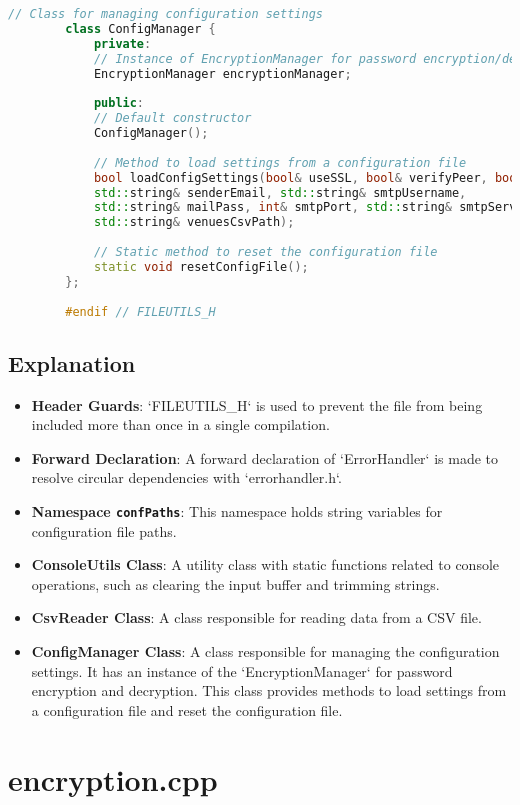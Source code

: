\documentclass{article}
\begin{document}
\begin{mdframed}[backgroundcolor=background, hidealllines=false, innerleftmargin=15pt, innerrightmargin=5pt, innertopmargin=0pt, innerbottommargin=-5pt, linecolor=accent]
\begin{lstlisting}[language=C++]
		// Class for managing configuration settings
		class ConfigManager {
			private:
			// Instance of EncryptionManager for password encryption/decryption
			EncryptionManager encryptionManager;
			
			public:
			// Default constructor
			ConfigManager();
			
			// Method to load settings from a configuration file
			bool loadConfigSettings(bool& useSSL, bool& verifyPeer, bool& verifyHost, bool& verbose, 
			std::string& senderEmail, std::string& smtpUsername, 
			std::string& mailPass, int& smtpPort, std::string& smtpServer, 
			std::string& venuesCsvPath);
			
			// Static method to reset the configuration file
			static void resetConfigFile();
		};
		
		#endif // FILEUTILS_H
	\end{lstlisting}
\end{mdframed}
	\subsection*{Explanation}
	\begin{itemize}
		\item \textbf{Header Guards}: `FILEUTILS\_H` is used to prevent the file from being included more than once in a single compilation.
		\item \textbf{Forward Declaration}: A forward declaration of `ErrorHandler` is made to resolve circular dependencies with `errorhandler.h`.
		\item \textbf{Namespace \texttt{confPaths}}: This namespace holds string variables for configuration file paths.
		\item \textbf{ConsoleUtils Class}: A utility class with static functions related to console operations, such as clearing the input buffer and trimming strings.
		\item \textbf{CsvReader Class}: A class responsible for reading data from a CSV file.
		\item \textbf{ConfigManager Class}: A class responsible for managing the configuration settings. It has an instance of the `EncryptionManager` for password encryption and decryption. This class provides methods to load settings from a configuration file and reset the configuration file.
	\end{itemize}
	
	\section{encryption.cpp}
	
\end{document}
